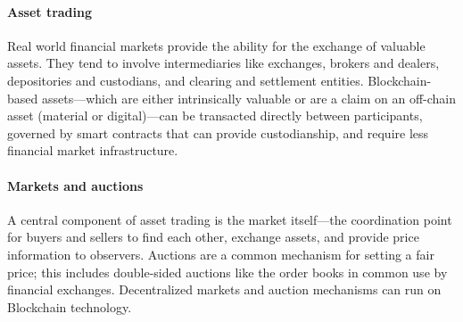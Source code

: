 \paragraph{Asset trading}

Real world financial markets provide the ability for the exchange of valuable assets. 
They tend to involve intermediaries like exchanges, brokers and dealers, depositories and custodians, and clearing and settlement entities. 
Blockchain-based assets---which are either intrinsically valuable or are a claim on an off-chain asset (material or digital)---can be transacted directly between participants, governed by smart contracts that can provide custodianship, and require less financial market infrastructure.

\paragraph{Markets and auctions}

A central component of asset trading is the market itself---the coordination point for buyers and sellers to find each other, exchange assets, and provide price information to observers.
Auctions are a common mechanism for setting a fair price; this includes double-sided auctions like the order books in common use by financial exchanges. 
Decentralized markets and auction mechanisms can run on Blockchain technology.

